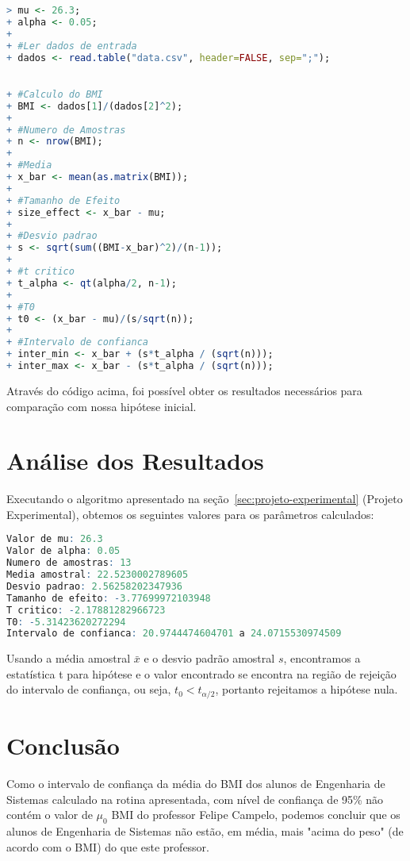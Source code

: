 \documentclass[12pt, a4paper]{article}
\begin{document}
\begin{lstlisting}[language=R]
> mu <- 26.3;
+ alpha <- 0.05;
+	
+ #Ler dados de entrada
+ dados <- read.table("data.csv", header=FALSE, sep=";");
	

+ #Calculo do BMI
+ BMI <- dados[1]/(dados[2]^2);
+	
+ #Numero de Amostras
+ n <- nrow(BMI);
+	
+ #Media
+ x_bar <- mean(as.matrix(BMI));
+	
+ #Tamanho de Efeito
+ size_effect <- x_bar - mu;
+	
+ #Desvio padrao
+ s <- sqrt(sum((BMI-x_bar)^2)/(n-1));
+	
+ #t critico
+ t_alpha <- qt(alpha/2, n-1);
+
+ #T0
+ t0 <- (x_bar - mu)/(s/sqrt(n));
+	
+ #Intervalo de confianca
+ inter_min <- x_bar + (s*t_alpha / (sqrt(n)));
+ inter_max <- x_bar - (s*t_alpha / (sqrt(n)));	
\end{lstlisting}
\par Através do código acima, foi possível obter os resultados necessários para comparação com nossa hipótese inicial.

\section{Análise dos Resultados}
Executando o algoritmo apresentado na seção~\ref{sec:projeto-experimental} (Projeto Experimental), obtemos os seguintes valores para os parâmetros calculados:

\begin{lstlisting}[language=R]
Valor de mu: 26.3
Valor de alpha: 0.05
Numero de amostras: 13
Media amostral: 22.5230002789605
Desvio padrao: 2.56258202347936
Tamanho de efeito: -3.77699972103948
T critico: -2.17881282966723
T0: -5.31423620272294
Intervalo de confianca: 20.9744474604701 a 24.0715530974509
\end{lstlisting}

\par Usando a média amostral $\bar{x}$ e o desvio padrão amostral $s$, encontramos a estatística t para hipótese e o valor encontrado se encontra na região de rejeição do intervalo de confiança, ou seja, $t_{0} < t_{\alpha/2}$, portanto rejeitamos a hipótese nula.

\section{Conclusão}
\par Como o intervalo de confiança da média do BMI dos alunos de Engenharia de Sistemas calculado na rotina apresentada, com nível de confiança de 95\% não contém o valor de $\mu_{0}$ BMI do professor Felipe Campelo, podemos concluir que os alunos de Engenharia de Sistemas não estão, em média, mais "acima do peso" (de acordo com o BMI) do que este professor.
\end{document}

